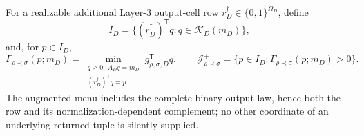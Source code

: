 For a realizable additional Layer-3 output-cell row \(r_D^\dagger\in\{0,1\}^{\Omega_D}\), define
\[
I_D=\{(r_D^\dagger)^{\mathsf T}q:q\in\mathcal K_D(m_D)\},
\]
and, for \(p\in I_D\),
\[
\Gamma_{\rho\prec\sigma}(p;m_D)=
\min_{\substack{q\geq0,\ A_Dq=m_D\\(r_D^\dagger)^{\mathsf T}q=p}}
g_{\rho,\sigma,D}^{\mathsf T}q,
\qquad
\mathcal J_{\rho\prec\sigma}^+=
\{p\in I_D:\Gamma_{\rho\prec\sigma}(p;m_D)>0\}.
\]
The augmented menu includes the complete binary output law, hence both the row and its normalization-dependent complement; no other coordinate of an underlying returned tuple is silently supplied.
